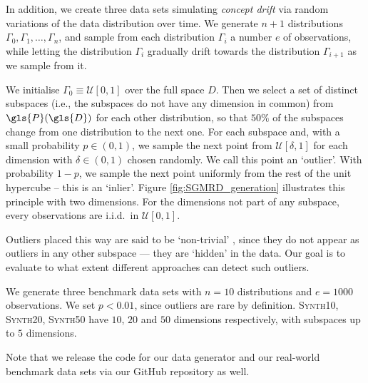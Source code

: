 In addition, we create three data sets simulating \textit{concept drift} \cite{DBLP:conf/ictai/BarddalGE15} via random variations of the data distribution over time. We generate $n+1$ distributions $\Gamma_0, \Gamma_1, \dots, \Gamma_{n}$, and sample from each distribution $\Gamma_i$ a number $e$ of observations, while letting the distribution $\Gamma_i$ gradually drift towards the distribution $\Gamma_{i+1}$ as we sample from it. 

We initialise $\Gamma_0 \equiv \mathcal{U}[0,1]$ over the full space $D$. Then we select a set of distinct subspaces (i.e., the subspaces do not have any dimension in common) from $ \gls{P}(\gls{D})$ for each other distribution, so that $50\%$ of the subspaces change from one distribution to the next one. 
For each subspace and, with a small probability $p \in (0,1)$, we sample the next point from $\mathcal{U}[\delta, 1]$ for each dimension with $\delta \in (0,1)$ chosen randomly. We call this point an `outlier'. With probability $1-p$, we sample the next point uniformly from the rest of the unit hypercube -- this is an `inlier'. Figure \ref{fig:SGMRD_generation} illustrates this principle with two dimensions. For the dimensions not part of any subspace, every observations 
are i.i.d.\ in $\mathcal{U}[0,1]$.

Outliers placed this way are said to be `non-trivial' \cite{DBLP:conf/icde/KellerMB12}, since they do not appear as outliers in any other subspace --- they are `hidden' in the data. 
Our goal is to evaluate to what extent different approaches can detect such outliers. 

We generate three benchmark data sets with $n=10$ distributions and $e=1000$ observations. We set $p < 0.01$, since outliers are rare by definition. \textsc{Synth10}, \textsc{Synth20}, \textsc{Synth50} have $10$, $20$ and $50$ dimensions respectively, with subspaces up to $5$ dimensions. 

Note that we release the code for our data generator and our real-world benchmark data sets via our GitHub repository as well.  

